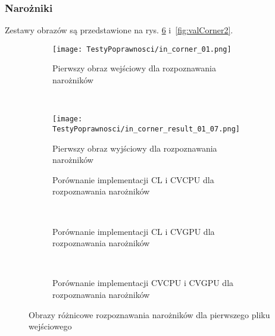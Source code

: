 \subsubsection{Narożniki}
\label{subsubsec:naroznikiRysunki}

Zestawy obrazów są przedstawione na rys. \ref{fig:valCorner1} i~\ref{fig:valCorner2}. 

\begin{figure}[h]

\begin{center}
\begin{subfigure}[t]{0.3\textwidth}
\texttt{[image: TestyPoprawnosci/in\_corner\_01.png]}
\caption{Pierwszy obraz wejściowy dla rozpoznawania narożników}
\label{fig:valCorner01}
\end{subfigure}
~
\begin{subfigure}[t]{0.3\textwidth}
\texttt{[image: TestyPoprawnosci/in\_corner\_result\_01\_07.png]}
\caption{Pierwszy obraz wyjściowy dla rozpoznawania narożników}
\label{fig:valCornerResult01}
\end{subfigure}
\end{center}

\begin{subfigure}[t]{0.3\textwidth}
	\centering
	\setlength\fboxsep{0pt}
	\setlength\fboxrule{0.5pt}
	\caption{Porównanie implementacji CL i CVCPU dla rozpoznawania narożników}
	\label{fig:valCorner1CLCVCPU}
\end{subfigure}
~
\begin{subfigure}[t]{0.3\textwidth}
	\centering
	\setlength\fboxsep{0pt}
	\setlength\fboxrule{0.5pt}
	\caption{Porównanie implementacji CL i CVGPU dla rozpoznawania narożników}
	\label{fig:valCorner1CLCVGPU}
\end{subfigure}
~
\begin{subfigure}[t]{0.3\textwidth}
	\centering
	\setlength\fboxsep{0pt}
	\setlength\fboxrule{0.5pt}
	\caption{Porównanie implementacji CVCPU i CVGPU dla rozpoznawania narożników}
	\label{fig:valCorner1CVCPUCVGPU}                 
\end{subfigure}
\caption{Obrazy różnicowe rozpoznawania narożników dla pierwszego pliku wejściowego}

\label{fig:valCorner1}
\end{figure}

